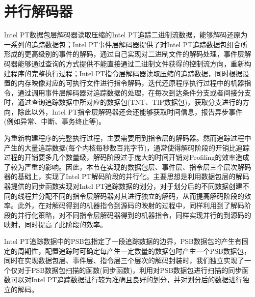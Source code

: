 \section{并行解码器}
Intel PT数据包层解码器读取压缩的Intel PT追踪二进制流数据，能够解码还原为一系列的追踪数据包；Intel PT事件层解码器提供了对Intel PT追踪数据包组合所形成的更高级别的事件的解码，通过自己实现对二进制文件的解码处理，事件层解码器能够通过查询的方式提供不能直接通过二进制文件获得的控制流方向，重新构建程序的完整执行过程；Intel PT指令层解码器读取压缩的追踪数据，同时根据设置的内存映像对应的可执行文件进行指令解码，迭代还原程序执行过程中的机器指令，通过调用事件层解码器对追踪数据的处理，在每次到达条件分支或者间接分支时，通过查询追踪数据中所对应的数据包(TNT、TIP数据包)，获取分支进行的方向，除此以外，Intel PT指令层解码器还会还能够获取时间信息，报告异步事件(例如异常、中断、事务终止等)。

为重新构建程序的完整执行过程，主要需要用到指令层的解码器。然而追踪过程中产生的大量追踪数据(每个内核每秒数百兆字节)，通常使得解码阶段的开销比追踪过程的开销要多几个数量级，解码阶段过于庞大的时间开销对Profiling的效率造成了较为严重的影响。因此，本节在实现的数据包层、事件层、指令层三个层次解码器的基础上，实现了Intel PT解码阶段的并行化。主要思想是利用数据包层的解码器提供的同步函数实现对Intel PT追踪数据的划分，对于划分后的不同数据创建不同的线程并分配不同的指令层解码器对其进行独立的解码，从而提高解码阶段的效率。此外，在对解码得到的机器指令到源码的映射的过程中，同样利用到了解码阶段的并行化策略，对不同指令层解码器得到的机器指令，同样实现并行的到源码的映射，同时提高了此阶段的效率。

Intel PT追踪数据中的PSB包指定了一段追踪数据的边界，PSB数据包的产生有固定的周期性，配置追踪时可确定每产生一定数量的数据包时产生一个PSB数据包，同时在实现数据包层、事件层、指令层三个层次的解码封装时，我们独立实现了一个仅对于PSB数据包扫描的函数(同步函数)，利用对PSB数据包进行扫描的同步函数可以对Intel PT追踪数据进行较为准确且良好的划分，并对划分后的数据进行独立的解码。


